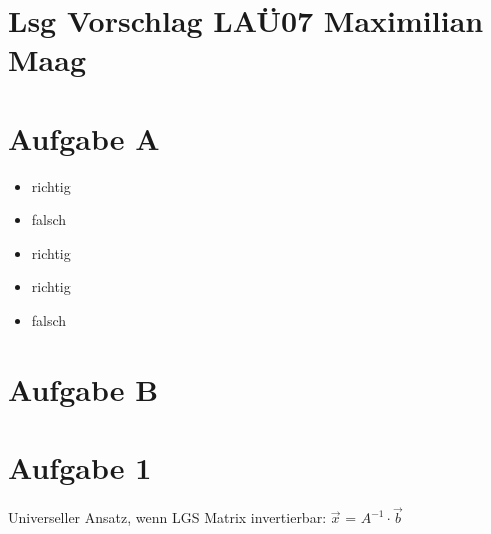 \documentclass{article}
\begin{document}
	\section*{Lsg Vorschlag LAÜ07 Maximilian Maag}
	\section*{Aufgabe A}
	\begin{itemize}
		\item richtig
		\item falsch
		\item richtig
		\item richtig
		\item falsch
	\end{itemize}
	\section*{Aufgabe B}
	\section*{Aufgabe 1}
	Universeller Ansatz, wenn LGS Matrix invertierbar: $\vec{x}$ = $A^{-1} \cdot \vec{b}$
\end{document}
